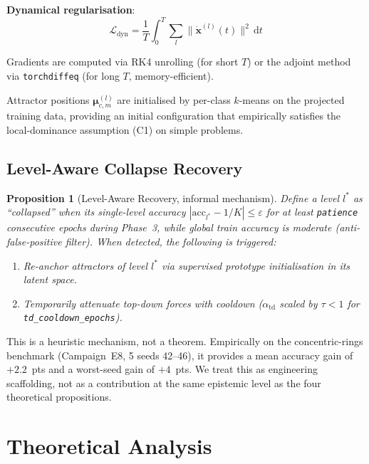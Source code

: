 \documentclass[11pt,a4paper]{article}
\newtheorem{proposition}[theorem]{Proposition}
\begin{document}
\textbf{Dynamical regularisation}:
\begin{equation}
  \mathcal{L}_{\mathrm{dyn}} = \frac{1}{T}\int_0^T \sum_l \|\dot{\mathbf{x}}^{(l)}(t)\|^2\, \mathrm{d}t
\end{equation}

Gradients are computed via RK4 unrolling (for short $T$) or the adjoint
method~\cite{chen2018neural} via \texttt{torchdiffeq} (for long $T$, memory-efficient).

Attractor positions $\boldsymbol{\mu}^{(l)}_{c,m}$ are initialised by per-class $k$-means
on the projected training data, providing an initial configuration that empirically
satisfies the local-dominance assumption (C1) on simple problems.

\subsection{Level-Aware Collapse Recovery}
\label{sec:p6}

\begin{proposition}[Level-Aware Recovery, informal mechanism]
\label{prop:p6}
Define a level $l^*$ as ``collapsed'' when its single-level accuracy
$|\mathrm{acc}_{l^*} - 1/K| \le \varepsilon$ for at least \texttt{patience}
consecutive epochs during Phase~3, while global train accuracy is moderate
(anti-false-positive filter). When detected, the following is triggered:
\begin{enumerate}
  \item Re-anchor attractors of level $l^*$ via supervised prototype initialisation in
        its latent space.
  \item Temporarily attenuate top-down forces with cooldown ($\alpha_{\mathrm{td}}$ scaled
        by $\tau<1$ for \texttt{td\_cooldown\_epochs}).
\end{enumerate}
\end{proposition}

This is a heuristic mechanism, not a theorem. Empirically on the concentric-rings
benchmark (Campaign~E8, 5 seeds 42--46), it provides a mean accuracy gain of $+2.2$~pts
and a worst-seed gain of $+4$~pts. We treat this as engineering scaffolding, not as a
contribution at the same epistemic level as the four theoretical propositions.

\section{Theoretical Analysis}
\label{sec:theory}
\end{document}
